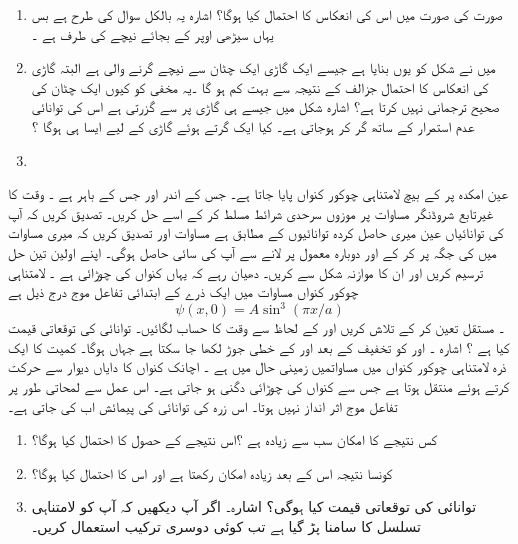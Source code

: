 \begin{enumerate}
\item  صورت   کی صورت میں اس کی انعکاس کا احتمال کیا ہوگا؟
 اشارہ یہ بالکل سوال  کی طرح ہے بس یہاں سیڑھی  اوپر کے بجائے نیچے کی طرف ہے ۔
\item 
 میں نے شکل کو یوں بنایا ہے جیسے ایک گاڑی ایک چٹان سے نیچے گرنے والی ہے البتہ گاڑی کی انعکاس کا احتمال جزالف کے نتیجہ سے بہت کم ہو گا ۔یہ مخفی کو کیوں ایک چٹان کی صحیح ترجمانی نہیں کرتا ہے؟
 اشارہ شکل میں جیسے ہی گاڑی  پر سے گزرتی ہے اس کی توانائی عدم استمرار کے ساتھ گر کر  ہوجاتی ہے۔ کیا ایک گرتے ہوئے گاڑی کے لیے ایسا ہی ہوگا ؟
\item
\end{enumerate}
عین امکدہ پر  کے بیچ لامتناہی چوکور کنواں پایا جاتا ہے۔ جس کے اندر اور جس کے باہر  ہے ۔ وقت کا  غیرتابع شروڈنگر مساوات پر موزوں سرحدی شرائط مسلط کر کے اسے حل کریں۔ تصدیق کریں کہ آپ کی توانائیاں عین  میری حاصل کردہ توانائیوں کے مطابق ہے مساوات اور تصدیق کریں کہ میری  مساوات میں  کی جگہ  پر کر کے اور دوبارہ معمول پر لانے سے آپ کی سائی حاصل ہوگی۔ اپنے اولین تین حل ترسیم کریں اور ان کا موازنہ شکل  سے کریں۔  دھیان رہے کہ یہاں کنواں کی چوڑائی   ہے ۔ 
 لامتناہی چوکور کنواں مساوات  میں ایک ذرے کے ابتدائی تفاعل موج درج ذیل ہے\[ \psi(x,0)=A\sin^{3}(\pi x/a)\]۔ 
 مستقل   تعین کر کے تلاش کریں  اور  کے لحاظ سے وقت  کا حساب لگائیں۔ توانائی کی توقعاتی قیمت کیا ہے ؟
 اشارہ ۔ اور 
 کو تخفیف کے بعد  اور کے خطی جوڑ  لکھا جا سکتا ہے جہاں   ہوگا۔
 کمیت کا ایک ذرہ لامتناہی چوکور کنواں میں مساواتمیں زمینی حال میں ہے ۔ اچانک کنواں کا دایاں دیوار  سے حرکت کرتے ہوئے   منتقل ہوتا ہے جس سے کنواں کی چوڑائی دگنی ہو جاتی ہے۔ اس عمل سے لمحاتی طور پر تفاعل موج اثر انداز نہیں ہوتا۔ اس زرہ کی توانائی کی پیمائش اب کی جاتی ہے۔
\begin{enumerate}
\item کس نتیجے کا امکان سب سے زیادہ ہے ؟اس نتیجے کے حصول کا احتمال کیا ہوگا؟ 
\item کونسا نتیجہ اس کے بعد زیادہ امکان رکھتا ہے اور اس کا احتمال کیا ہوگا؟
\item 
توانائی کی توقعاتی قیمت کیا ہوگی؟ اشارہ۔ اگر آپ دیکھیں کہ آپ کو لامتناہی تسلسل کا سامنا پڑ گیا ہے تب کوئی دوسری ترکیب استعمال کریں۔
\end{enumerate} 
